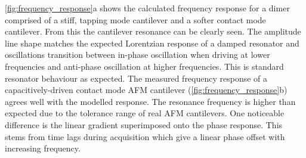 \documentclass{article}
\begin{document}
\autoref{fig:frequency_response}a shows the calculated frequency response for a dimer comprised of a stiff, tapping mode cantilever and a softer contact mode cantilever. From this the cantilever resonance can be clearly seen. The amplitude line shape matches the expected Lorentzian response of a damped resonator and oscillations transition between in-phase oscillation when driving at lower frequencies and anti-phase oscillation at higher frequencies. This is standard resonator behaviour as expected.
The measured frequency response of a capacitively-driven contact mode AFM cantilever (\autoref{fig:frequency_response}b) agrees well with the modelled response. The resonance frequency is higher than expected due to the tolerance range of real AFM cantilevers. One noticeable difference is the linear gradient superimposed onto the phase response. This stems from time lags during acquisition which give a linear phase offset with increasing frequency. %
\end{document}
